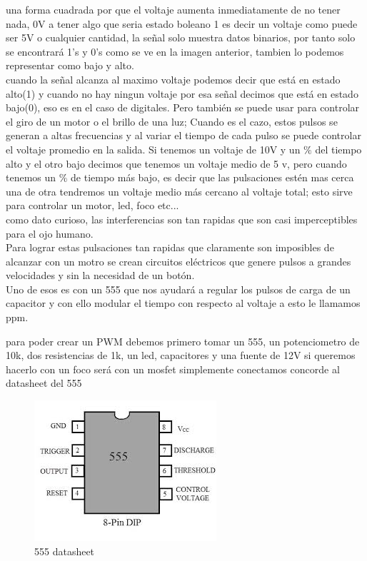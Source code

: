 \documentclass[letterpaper]{article}
\begin{document}
\begin{large}
una forma cuadrada por que el voltaje aumenta inmediatamente de no tener nada, 0V a tener algo que seria estado boleano 1 es decir un voltaje como puede ser 5V o cualquier cantidad, la señal solo muestra datos binarios, por tanto solo se encontrará 1's y 0's como se ve en la imagen anterior, tambien lo podemos representar como bajo y alto.\\
cuando la señal alcanza al maximo voltaje podemos decir que está en estado alto(1) y cuando no hay ningun voltaje por esa señal decimos que está en estado bajo(0), eso es en el caso de digitales. Pero también se puede usar para controlar el giro de un motor o el brillo de una luz; Cuando es el cazo, estos pulsos se generan a altas frecuencias y al variar el tiempo de cada pulso se puede controlar el voltaje promedio en la salida.
Si tenemos un voltaje de 10V y un $\%$ del tiempo alto y el otro bajo decimos que tenemos un voltaje medio de 5 v, pero cuando tenemos un $\%$ de tiempo más bajo, es decir que las pulsaciones estén mas cerca una de otra tendremos un voltaje medio más cercano al voltaje total; esto sirve para controlar un motor, led, foco etc...\\
como dato curioso, las interferencias son tan rapidas que son casi imperceptibles para el ojo humano.\\

Para lograr estas pulsaciones tan rapidas que claramente son imposibles de alcanzar con un motro se crean circuitos eléctricos que genere pulsos a grandes velocidades y sin la necesidad de un botón.\\

Uno de esos es con un 555 que nos ayudará a regular los pulsos de carga de un capacitor y con ello modular el tiempo con respecto al voltaje a esto le llamamos ppm.\\
\end{large}
para poder crear un PWM debemos primero tomar un 555, un potenciometro de 10k, dos resistencias de 1k, un led, capacitores y una fuente de 12V
si queremos hacerlo con un foco será con un mosfet
 simplemente conectamos concorde al datasheet del 555\\
\begin{figure}[hbtp]
\caption{555 datasheet}
\centering
\includegraphics[scale=1]{555.jpeg}
\end{figure}
\end{document}
